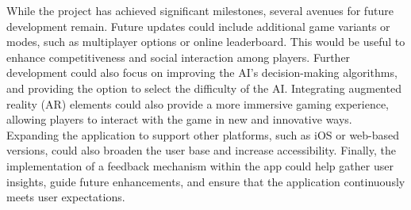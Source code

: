 While the project has achieved significant milestones, several avenues for future development remain. Future updates could include additional game variants or modes, such as multiplayer options or online leaderboard. This would be useful to enhance competitiveness and social interaction among players. Further development could also focus on improving the AI's decision-making algorithms, and providing the option to select the difficulty of the AI. Integrating augmented reality (AR) elements could also provide a more immersive gaming experience, allowing players to interact with the game in new and innovative ways. Expanding the application to support other platforms, such as iOS or web-based versions, could also broaden the user base and increase accessibility. Finally, the implementation of a feedback mechanism within the app could help gather user insights, guide future enhancements, and ensure that the application continuously meets user expectations.
